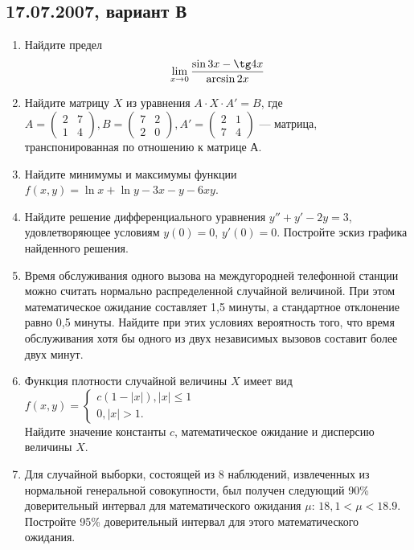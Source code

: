 \documentclass[pdftex,12pt,a4paper]{article}
\begin{document}
\subsection{17.07.2007, вариант В}
\begin{enumerate}
\item Найдите предел
\begin{equation}
\lim_{x\to 0} \frac{\sin 3x-\tg 4x}{\arcsin 2x}
\end{equation}
\item Найдите матрицу $X$ из уравнения $A\cdot X\cdot A'=B$, где $A=\left(\begin{array}{cc}
2 & 7\\
1 & 4
\end{array}\right), B=\left(\begin{array}{cc}
7 & 2\\
2 & 0
\end{array}\right), A'=\left(\begin{array}{cc}
2 & 1\\
7 & 4
\end{array}\right)$ --- матрица, транспонированная по отношению к матрице А.\\
\item Найдите минимумы и максимумы функции $f(x,y)=\ln x+\ln y-3x-y-6xy$.\\
\item Найдите решение дифференциального уравнения $y''+y'-2y=3$, удовлетворяющее условиям $y(0)=0$, $y'(0)=0$. Постройте эскиз графика найденного решения.\\
\item Время обслуживания одного вызова на междугородней телефонной станции можно считать нормально распределенной случайной величиной. При этом математическое ожидание составляет 1,5 минуты, а стандартное отклонение равно 0,5 минуты. Найдите при этих условиях вероятность того, что время обслуживания хотя бы одного из двух независимых вызовов составит более двух минут.\\
\item Функция плотности случайной величины $X$ имеет вид\\
$f(x,y)=\begin{cases}
c(1-|x|), |x|\leq 1\\
0, |x|>1.
\end{cases}$\\
Найдите значение константы $c$, математическое ожидание и дисперсию величины $X$.\\
\item Для случайной выборки, состоящей из 8 наблюдений, извлеченных из нормальной генеральной совокупности, был получен следующий 90\% доверительный интервал для математического ожидания $\mu$: $18,1<\mu< 18.9$. Постройте 95\% доверительный интервал для этого математического ожидания.\\

\end{enumerate}
\end{document}
